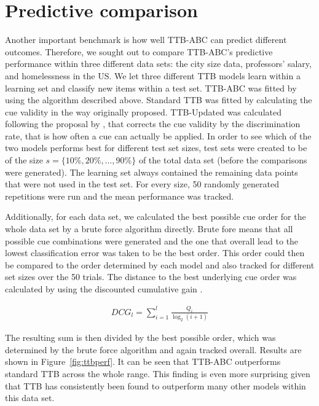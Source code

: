 \documentclass[a4paper,man, natbib]{apa6}
\begin{document}
\section{Predictive comparison}
Another important benchmark is how well TTB-ABC can predict different outcomes. Therefore, we sought out to compare TTB-ABC's predictive performance within three different data sets: the city size data, professors' salary, and homelessness in the US. We let three different TTB models learn within a learning set and classify new items within a test set.  TTB-ABC was fitted by using the algorithm described above. Standard TTB was fitted by calculating the cue validity in the way originally proposed. TTB-Updated was calculated following the proposal by \cite{newell2004search}, that corrects the cue validity by the discrimination rate, that is how often a cue can actually be applied. In order to see which of the two models performs best for different test set sizes, test sets were created to be of the size $s=\{10\%,20\%,\dots,90\%\}$ of the total data set (before the comparisons were generated). The learning set always contained the remaining data points that were not used in the test set. For every size, 50 randomly generated repetitions were run and the mean performance was tracked.  

Additionally, for each data set, we calculated the best possible cue order for the whole data set by a brute force algorithm directly. Brute fore means that all possible cue combinations were generated and the one that overall lead to the lowest classification error was taken to be the best order. This order could then be compared to the order determined by each model and also tracked for different set sizes over the 50 trials. The distance to the best underlying cue order was calculated by using the discounted cumulative gain \citep{netharecognizing}.

\begin{align}
DCG_l=\sum_{i=1}^{l}\frac{Q_i}{\log_2(i+1)}
\end{align}

The resulting sum is then divided by the best possible order, which was determined by the brute force algorithm and again tracked overall.
Results are shown in Figure~\ref{fig:ttbperf}. It can be seen that TTB-ABC outperforms standard TTB across the whole range. This finding is even more surprising given that TTB has consistently been found to outperform many other models within this data set.

\end{document}

